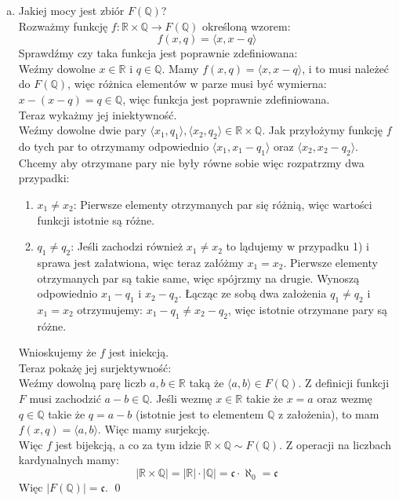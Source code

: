 \documentclass[10pt]{article}
\newcommand{\R}{\mathbb{R}}
\newcommand{\Q}{\mathbb{Q}}
\newcommand{\cont}{\mathfrak{c}}
\begin{document}
\begin{enumerate}[a)]
    \newpage
    
    \item Jakiej mocy jest zbiór $F(\Q)$? \\[10pt]
    Rozważmy funkcję $f \colon \R \times \Q \to F(\Q)$ określoną wzorem:
    $$f(x, q) = \langle x, x - q \rangle$$
    Sprawdźmy czy taka funkcja jest poprawnie zdefiniowana: \\[5pt]
    Weźmy dowolne $x \in \R$ i $q \in \Q$. Mamy $f(x,q) = \langle x, x - q \rangle$, i to musi należeć do $F(\Q)$, więc różnica elementów w parze musi być wymierna: $x - (x - q) = q \in \Q$, więc funkcja jest poprawnie zdefiniowana. \\[5pt]
    Teraz wykażmy jej iniektywność. \\[5pt]
    Weźmy dowolne dwie pary $\langle x_1, q_1 \rangle, \langle x_2, q_2 \rangle \in \R \times \Q$. Jak przyłożymy funkcję $f$ do tych par to otrzymamy odpowiednio $\langle x_1, x_1 - q_1 \rangle$ oraz $\langle x_2, x_2 - q_2 \rangle$. Chcemy aby otrzymane pary nie były równe sobie więc rozpatrzmy dwa przypadki:
    \begin{enumerate}[1)]
        \item $x_1 \neq x_2$: Pierwsze elementy otrzymanych par się różnią, więc wartości funkcji istotnie są różne.

        \item $q_1 \neq q_2$: Jeśli zachodzi również $x_1 \neq x_2$ to lądujemy w przypadku 1) i sprawa jest załatwiona, więc teraz załóżmy $x_1 = x_2$. Pierwsze elementy otrzymanych par są takie same, więc spójrzmy na drugie. Wynoszą odpowiednio $x_1 - q_1$ i $x_2 - q_2$. Łącząc ze sobą dwa założenia $q_1 \neq q_2$ i $x_1 = x_2$ otrzymujemy: $x_1 - q_1 \neq x_2 - q_2$, więc istotnie otrzymane pary są różne.
    \end{enumerate}
    Wnioskujemy że $f$ jest iniekcją. \\[5pt]
    Teraz pokażę jej surjektywność: \\[5pt]
    Weźmy dowolną parę liczb $a, b \in \R$ taką że $\langle a, b \rangle \in F(\Q)$. Z definicji funkcji $F$ musi zachodzić $a - b \in \Q$. Jeśli wezmę $x \in \R$ takie że $x = a$ oraz wezmę $q \in \Q$ takie że $q = a - b$ (istotnie jest to elementem $\Q$ z założenia), to mam $f(x, q) = \langle a, b \rangle$. Więc mamy surjekcję. \\[10pt]
    Więc $f$ jest bijekcją, a co za tym idzie $\R \times \Q \sim F(\Q)$. Z operacji na liczbach kardynalnych mamy:
    $$|\R \times \Q| = |\R| \cdot |\Q| = \cont \cdot \aleph_0 = \cont$$
    Więc $|F(\Q)| = \cont$. \qed
\end{enumerate}
\end{document}
